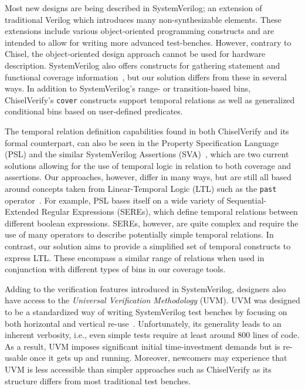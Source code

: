 \documentclass[conference]{IEEEtran}
\begin{document}
Most new designs are being described in SystemVerilog; an extension of traditional Verilog 
which introduces many non-synthesizable elements. These extensions include various object-oriented 
programming constructs and are intended to allow for writing more advanced test-benches. However, 
contrary to Chisel, the object-oriented design approach cannot be used for hardware 
description. SystemVerilog also offers constructs for gathering statement and functional 
coverage information~\cite{spear2008systemverilog}, but our solution differs from these in 
several ways. In addition to SystemVerilog's range- or transition-based bins, 
ChiselVerify's \texttt{cover} constructs support temporal relations as well as generalized 
conditional bins based on user-defined predicates. 

The temporal relation definition capabilities found in both ChiselVerify and its formal counterpart, can also be seen in the Property Specification Language (PSL) and the similar SystemVerilog Assertions (SVA)~\cite{Boule2008}, which are two current solutions allowing for the use of temporal logic in relation to both coverage and assertions. 
Our approaches, however, differ in many ways, but are still all based around concepts taken from Linear-Temporal Logic (LTL) such as the \texttt{past} operator~\cite{Dax2010:temporal-logics}.
For example, PSL bases itself on a wide variety of Sequential-Extended Regular Expressions (SEREs), which define temporal relations between different boolean expressions.
SEREs, however, are quite complex and require the use of many operators to describe potentially simple temporal relations. 
In contrast, our solution aims to provide a simplified set of temporal constructs to express LTL.
These encompass a similar range of relations when used in conjunction with different types of bins in our coverage tools.


Adding to the verification features introduced in SystemVerilog, designers also have 
access to the \textit{Universal Verification Methodology} (UVM). UVM was designed to be a 
standardized way of writing SystemVerilog test benches by focusing on both horizontal and 
vertical re-use~\cite{uvm2015}. Unfortunately, its generality leads to an inherent 
verbosity, i.e., even simple tests require at least around 800 lines of code. As a result, 
UVM imposes significant initial time-investment demands but is re-usable once it gets up and 
running. Moreover, newcomers may experience that UVM is less accessible than simpler approaches 
such as ChiselVerify as its structure differs from most traditional test benches.
\end{document}
